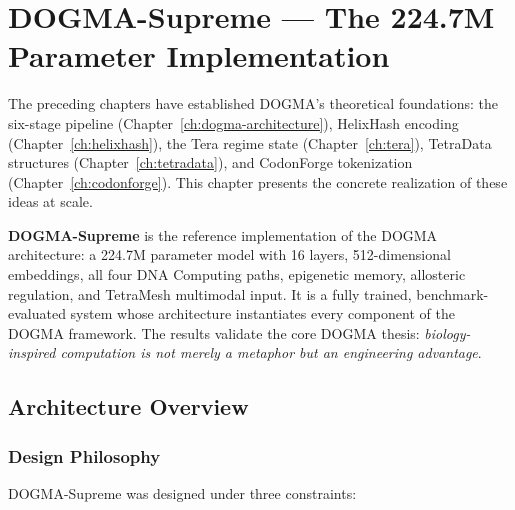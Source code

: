 
\chapter{DOGMA-Supreme --- The 224.7M Parameter Implementation}
\label{ch:dogma-supreme}


\noindent
The preceding chapters have established DOGMA's theoretical foundations: the six-stage pipeline (Chapter~\ref{ch:dogma-architecture}), HelixHash encoding (Chapter~\ref{ch:helixhash}), the Tera regime state (Chapter~\ref{ch:tera}), TetraData structures (Chapter~\ref{ch:tetradata}), and CodonForge tokenization (Chapter~\ref{ch:codonforge}). This chapter presents the concrete realization of these ideas at scale.

\textbf{DOGMA-Supreme} is the reference implementation of the DOGMA architecture: a 224.7M parameter model with 16 layers, 512-dimensional embeddings, all four DNA Computing paths, epigenetic memory, allosteric regulation, and TetraMesh multimodal input. It is a fully trained, benchmark-evaluated system whose architecture instantiates every component of the DOGMA framework. The results validate the core DOGMA thesis: \emph{biology-inspired computation is not merely a metaphor but an engineering advantage}.

\section{Architecture Overview}
\label{sec:supreme-overview}

\subsection{Design Philosophy}

DOGMA-Supreme was designed under three constraints:


